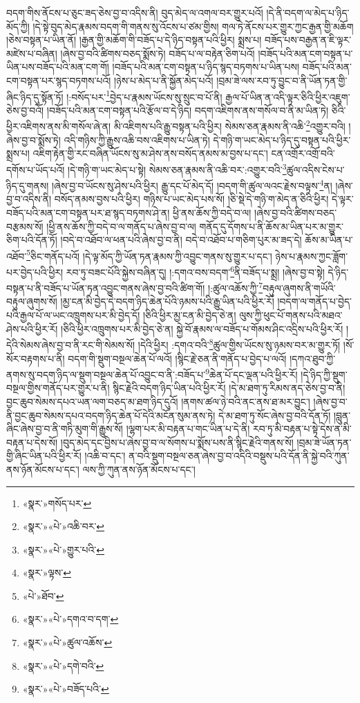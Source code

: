 བདག་གིས་ནོངས་པ་ཅུང་ཟད་ཅེས་བྱ་བ་འདིས་ནི། བུད་མེད་ལ་འགལ་བར་གྱུར་པའོ། །དེ་ནི་བདག་ལ་མེད་པ་ཉིད་མོད་ཀྱི། །དེ་སྟེ་བུད་མེད་རྣམས་བདག་གི་གནས་སུ་འོངས་པ་ཙམ་གྱིས། གལ་ཏེ་ནོངས་པར་གྱུར་ཀྱང་རྒྱན་གྱི་མཆོག །ཅེས་བསྟན་པ་ཡིན་ནོ། །རྒྱན་གྱི་མཆོག་གི་བཟོད་པ་དེ་ཉིད་བསྟན་པའི་ཕྱིར། སྨྲས་པ། བཟོད་པས་བརྒྱན་ན་ཇི་ལྟར་མཛེས་པ་བཞིན། །ཞེས་བྱ་བའི་ཚིགས་བཅད་སྨོས་ཏེ། བཟོད་པ་ལ་བརྟེན་ཅིག་པའོ། །བཟོད་པའི་མན་ངག་བསྟན་པ་ཡིན་པས་བཟོད་པའི་མན་ངག་གོ། །བཟོད་པའི་མན་ངག་བསྟན་པ་ཉིད་སྙད་བཏགས་པ་ཡིན་པས། བཟོད་པའི་མན་ངག་བསྟན་པར་སྙད་བཏགས་པའོ། །ཉེས་པ་མེད་པ་ནི་སྐྱོན་མེད་པའོ། །བྲམ་ཟེ་ལས་རབ་ཏུ་བྱུང་བ་ནི་ཡོན་ཏན་གྱི་ཞིང་ཉིད་དུ་སྟོན་ཏོ། །:བསོད་པར་\footnote{«སྣར་»གསོད་པར་}བྱེད་པ་རྣམས་ཡོངས་སུ་སྲུང་བ་པོ་ནི། རྒྱལ་པོ་ཡིན་ན་འདི་ལྟར་ཅིའི་ཕྱིར་འཇུག་ཅེས་བྱ་བའོ། །བཟོད་པའི་མན་ངག་བསྟན་པའི་རྩོལ་བ་དེ་ཉིད། བདག་འཇིགས་ནས་གསོལ་བ་ནི་མ་ཡིན་ཏེ། ཅིའི་ཕྱིར་འཇིགས་ནས་མི་གསོལ་ཞེ་ན། མི་འཇིགས་པའི་རྒྱུ་བསྟན་པའི་ཕྱིར། སེམས་ཅན་རྣམས་ནི་འཆི་\footnote{«སྣར་»«པེ་»འཆི་བར་}འགྱུར་བའི། །ཞེས་བྱ་བ་སྨོས་ཏེ། འདི་གཉིས་ཀྱི་རྒྱུས་འཆི་བས་འཇིགས་པ་ཡིན་ཏེ། དེ་གཉི་ག་ཡང་མེད་པ་ཉིད་དུ་བསྟན་པའི་ཕྱིར་སྨྲས་པ། འཇིག་རྟེན་གྱི་རང་བཞིན་ཡོངས་སུ་མ་ཤེས་ནས་བསོད་ནམས་མ་བྱས་པ་དང་། ངན་འགྲོར་འགྲོ་བའི་དགོས་པ་ཡོད་པའོ། །དེ་གཉི་ག་ཡང་མེད་པ་སྟེ། སེམས་ཅན་རྣམས་ནི་འཆི་བར་:འགྱུར་བའི་\footnote{«སྣར་»«པེ་»གྱུར་པའི་}ཚུལ་འདིས་ངེས་པ་ཉིད་དུ་གནས། །ཞེས་བྱ་བ་ཡོངས་སུ་ཤེས་པའི་ཕྱིར། རྒྱུ་དང་པོ་མེད་དོ། །བདག་གི་ཚུལ་ལའང་རྗེས་བལྟས་\footnote{«སྣར་»ལྟས་}ན། །ཞེས་བྱ་བ་འདིས་ནི། བསོད་ནམས་བྱས་པའི་ཕྱིར། གཉིས་པ་ཡང་མེད་པས་སོ། །ཅི་སྡེ་དེ་གཉི་ག་མེད་ན་ཅིའི་ཕྱིར། དེ་ལྟར་བཟོད་པའི་མན་ངག་བསྟན་པར་ཐ་སྙད་བཏགས་ཤེ་ན། ཕྱི་ནས་ཆོས་ཀྱི་བདེ་བ་ལ། །ཞེས་བྱ་བའི་ཚིགས་བཅད་བརྩམས་སོ། །ཕྱི་ནས་ཆོས་ཀྱི་བདེ་བ་ལ་གནོད་པ་ཞེས་བྱ་བ་ལ། གནོད་དུ་དོགས་པ་ནི་ཆོས་མ་ཡིན་པར་མ་གྱུར་ཅིག་པའི་དོན་ཏོ། །བདེ་བ་འཐོབ་ལ་ཕན་པའི་ཞེས་བྱ་བ་ནི། བདེ་བ་འཐོབ་པ་གཅིག་པུར་མ་ཟད་དེ། ཆོས་མ་ཡིན་པ་འཐོབ་\footnote{«པེ་»ཐོབ་}ཅིང་གནོད་པའོ། །དེ་ལྟ་མོད་ཀྱི་ཡོན་ཏན་རྣམས་ཀྱི་འབྱུང་གནས་སུ་གྱུར་པ་དང་། ཉེས་པ་རྣམས་ཀྱང་ཟློག་པར་བྱེད་པའི་ཕྱིར། རབ་ཏུ་བཟང་པོའི་སྐྱེས་བཞིན་དུ། །:དགའ་བས་བདག་\footnote{«སྣར་»«པེ་»དགའ་བ་དག་}ནི་བཟོད་པ་སྨྲ། །ཞེས་བྱ་བ་སྟེ། དེ་ཉིད་བསྟན་པ་ནི་བཟོད་པ་ཡོན་ཏན་འབྱུང་གནས་ཞེས་བྱ་བའི་ཚིག་གོ། །:ཚུལ་འཆོས་ཀྱི་\footnote{«སྣར་»«པེ་»ཚུལ་འཆོས་}བརྟུལ་ཞུགས་ནི་གཡོའི་བརྟུལ་ཞུགས་སོ། །མྱ་ངན་མི་བྱེད་དེ་བདག་ཉིད་ཆེན་པོའི་ཉམས་པའི་རྒྱུ་ཡིན་པའི་ཕྱིར་རོ། །བདག་ལ་གནོད་པ་བྱེད་པའི་རྒྱལ་པོ་ལ་ཡང་འཁྲུགས་པར་མི་བྱེད་དོ། །ཅིའི་ཕྱིར་མྱ་ངན་མི་བྱེད་ཅེ་ན། ལུས་ཀྱི་ཕུང་པོ་གནས་པའི་མཐའ་ཤེས་པའི་ཕྱིར་རོ། །ཅིའི་ཕྱིར་འཁྲུགས་པར་མི་བྱེད་ཅེ་ན། སྐྱེ་བོ་རྣམས་ལ་བཟོད་པ་གོམས་ཤིང་འདྲིས་པའི་ཕྱིར་རོ། །དེའི་སེམས་ཞེས་བྱ་བ་ནི་རང་གི་སེམས་སོ། །དེའི་ཕྱིར། :དགའ་བའི་\footnote{«སྣར་»«པེ་»དགེ་བའི་}ཚུལ་གྱིས་ཡོངས་སུ་ཉམས་བར་མ་གྱུར་ཏོ། །སོ་སོར་བརྟགས་པ་ནི། བདག་གི་སྡུག་བསྔལ་ཆེན་པོ་ལའོ། །སྙིང་རྗེ་ཅན་ནི་གནོད་པ་བྱེད་པ་ལའོ། །དཀའ་ཐུབ་ཀྱི་ནགས་སུ་བདག་ཉིད་ལ་སྡུག་བསྔལ་ཆེན་པོ་འབྱུང་བ་ནི་:བཟོད་པ་\footnote{«སྣར་»«པེ་»བཟོད་པའི་}ཆེན་པོ་དང་ལྡན་པའི་ཕྱིར་རོ། །དེ་ཉིད་ཀྱི་སྡུག་བསྔལ་གྱིས་གནོད་པར་གྱུར་པ་ནི། སྙིང་རྗེའི་བདག་ཉིད་ཡིན་པའི་ཕྱིར་རོ། །དེ་མ་ཐག་ཏུ་རིམས་ནད་ཅེས་བྱ་བ་ནི། བྱང་ཆུབ་སེམས་དཔའ་ཡན་ལག་བཅད་མ་ཐག་ཉིད་དུའོ། །ནགས་ཚལ་ཉེ་བའི་ནང་ནས་ཐ་མར་བྱུང་། །ཞེས་བྱ་བ་ནི་བྱང་ཆུབ་སེམས་དཔའ་བདག་ཉིད་ཆེན་པོ་དེའི་མངོན་སུམ་ནས་ཏེ། དེ་མ་ཐག་ཏུ་སོང་ཞེས་བྱ་བའི་དོན་ཏོ། །བླུན་ཞིང་ཞེས་བྱ་བ་ནི་གཏི་མུག་གི་རྒྱུས་སོ། །ལྷག་པར་མི་བརྟན་པ་གང་ཡིན་པ་དེ་ནི། རབ་ཏུ་མི་བརྟན་པ་སྟེ་དེས་ན་མི་བརྟན་པ་དེས་སོ། །བུད་མེད་དང་བྱིས་པ་ཞེས་བྱ་བ་ལ་སོགས་པ་སྨོས་པས་ནི་སྙིང་རྗེའི་གནས་སོ། །བྲམ་ཟེ་ཡོན་ཏན་གྱི་ཞིང་ཡིན་པའི་ཕྱིར་རོ། །འཆི་བ་དང་། ན་བའི་སྡུག་བསྔལ་ཅན་ཞེས་བྱ་བ་འདིའི་བསྡུས་པའི་དོན་ནི་སྐྱེ་བའི་ཀུན་ནས་ཉོན་མོངས་པ་དང་། ལས་ཀྱི་ཀུན་ནས་ཉོན་མོངས་པ་དང་། 